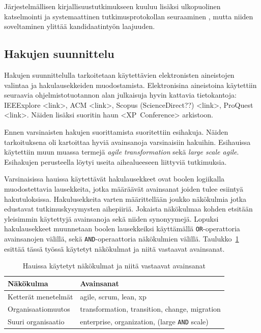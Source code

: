 Järjestelmällisen kirjallisuustutkimukseen kuuluu lisäksi ulkopuolinen
katselmointi ja systemaattinen tutkimusprotokollan seuraaminen
, mutta niiden soveltaminen ylittää kandidaatintyön
laajuuden.

\subsection{Hakujen suunnittelu}
Hakujen suunnittelulla tarkoitetaan käytettävien elektronisten aineistojen
valintaa ja hakulausekkeiden muodostamista. Elektronisina aineistoina käytettiin
seuraavia ohjelmistotuotannon alan julkaisuja hyvin kattavia tietokantoja:
IEEExplore <link>, ACM <link>, Scopus (ScienceDirect??) <link>, ProQuest <link>.
Näiden lisäksi suoritin haun <XP~Conference> arkistoon.

Ennen varsinaisten hakujen suorittamista suoritettiin esihakuja. Näiden
tarkoituksena oli kartoittaa hyviä avainsanoja varsinaisiin hakuihin. Esihauissa
käytettiin muun muassa termejä \textit{agile transformation} sekä \textit{large
scale agile}. Esihakujen perusteella löytyi useita aihealueeseen liittyviä
tutkimuksia.

Varsinaisissa hauissa käytettävät hakulausekkeet ovat boolen logiikalla
muodostettavia lausekkeita, jotka määräävät avainsanat joiden tulee esiintyä
hakutuloksissa. Hakulusekkeita varten määrittellään joukko näkökulmia jotka
edustavat tutkimuskysymysten aihepiiriä. Jokaista näkökulmaa kohden etsitään
yleisimmin käytettyjä avainsanoja sekä niiden synonyymejä. Lopuksi
hakulausekkeet muunnetaan boolen lausekkeiksi käyttämällä
\texttt{OR}-operattoria avainsanojen välillä, sekä \texttt{AND}-operaattoria
näkökulmien välillä. Taulukko~\ref{table:hakulausekkeet} esittää tässä työssä
käytetyt näkökulmat ja niitä vastaavat avainsanat.

\begin{table}[h]
    \begin{tabular}{|l|l|}
        \hline
        Näkökulma           & Avainsanat   \\ \hline
        Ketterät menetelmät & agile, scrum, lean, xp \\ 
        Organisaatiomuutos  & transformation, transition, change, migration \\
        Suuri organisaatio  & enterprise, organization, (large \texttt{AND} scale) \\
        \hline
    \end{tabular}
	\caption{Hauissa käytetyt näkökulmat ja niitä vastaavat avainsanat}
	\label{table:hakulausekkeet}
\end{table}

